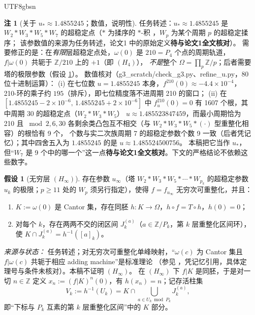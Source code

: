 \documentclass[11pt,a4paper]{article}
\newcommand{\Om}{\Omega}               %
\newcommand{\cyl}[2]{[#1]_{#2}}        %
\newcommand{\ust}{u_{*}}
\newcommand{\uinf}{u_{\infty}}
\theoremstyle{plain}
\theoremstyle{definition}
\newtheorem{hyp}[lem]{假设}
\newtheorem{rem}[lem]{注}
\begin{document}
\begin{CJK}{UTF8}{gbsn}
\begin{rem}[关于 $\ust\approx1.4855245$；数值，说明性]\label{g3:rem:ustar}
任务转述：$\ust\approx1.4855245$ 是 $W_2*W_3*W_5*W_7$ 的超稳定点（$*$ 为揉序的 $*$-积 \cite{MSS73}，$W_p$ 为某个周期 $p$ 的超稳定揉序；
该参数值的来源为任务转述，论文1 中的原始定义\textbf{待与论文1全文核对}）。
需要修正的是：在\emph{有限}层超稳定点处，$\omega(0)$ 是 $210=P_4$ 个点的周期轨道，$f|\omega(0)$ 共轭于 $\mathbb Z/210$ 上的 $+1$（即 $(H_4)$），
\emph{不是}整个 $\Om=\prod_p\mathbb Z/p$；后者需要塔的极限参数（假设 \ref{g3:hyp:infinite}）。
数值核对（g3\_scratch/check\_g3.py、refine\_u.py，80 位十进制运算）：
(i) 在七位数 $u=1.4855245$ 本身，$f^{210}(0)\approx-4.4\times10^{-4}$，210-环的乘子约 $195$（排斥），即七位精度落不进周期 210 的窗口；
(ii) 在 $[1.4855245-2\times10^{-6},\,1.4855245+2\times10^{-6}]$ 中 $f_u^{210}(0)=0$ 有 1607 个根，其中周期 30 的超稳定点（$W_2*W_3*W_5$）
$u\approx1.485523847459$，而最小周期恰为 210 且 $\bmod2,6,30$ 各剩余类凸包互不相交（与 $W_2*W_3*W_5*(\cdot)$ 型重整化相容）的根恰有 9 个，
个数与实二次族周期 7 的超稳定参数个数 9 一致（后者凭记忆）；其中四舍五入为 $1.4855245$ 的是 $u\approx1.485524500756$。
本稿把它当作 $\ust$，但“$W_7$ 是 9 个中的哪一个”这一点\textbf{待与论文1全文核对}。下文的严格结论不依赖这些数字。
\end{rem}

\begin{hyp}[无穷层 $(H_\infty)$]\label{g3:hyp:infinite}
存在参数 $\uinf$（塔 $W_2*W_3*W_5*\cdots*W_{p_k}$ 的超稳定参数 $u_k$ 的极限；$p\ge11$ 处的 $W_p$ 须另行指定），使得 $f=f_{\uinf}$ 无穷次可重整化，并且：
\begin{enumerate}[label=(\roman*)]
\item $K:=\omega(0)$ 是 Cantor 集，存在同胚 $h:K\to\Om$，$h\circ f=T\circ h$，$h(0)=0$；
\item 对每个 $k$，存在两两不交的闭区间 $J_k^{(a)}$（$a\in\mathbb Z/P_k$，第 $k$ 层重整化区间环），使 $K\cap J_k^{(a)}=h^{-1}(\cyl ak)$。
\end{enumerate}
\end{hyp}
\emph{来源与状态：} 任务转述；对无穷次可重整化单峰映射，“$\omega(c)$ 为 Cantor 集且 $f|\omega(c)$ 共轭于相应 adding machine”是标准理论
（参见 \cite{dMvS93}，凭记忆引用，具体定理号与条件未核对）。本稿不证明 $(H_\infty)$。
在 $(H_\infty)$ 下 $f|K$ 是同胚，于是对一切 $n\in\mathbb Z$ 定义 $x_n:=(f|K)^n(0)$，有 $h(x_n)=n$；记存活柱集
\[
V_k:=h^{-1}(U_k)=K\cap\bigcup_{a\in U_k\bmod P_k}J_k^{(a)},
\]
即“下标与 $P_k$ 互素的第 $k$ 层重整化区间”中的 $K$ 部分。


\end{CJK}
\end{document}
